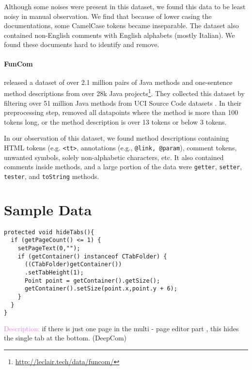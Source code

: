 \documentclass[11pt,a4paper]{article}
\begin{document}
Although some noises were present in this dataset, we found this data to be least noisy in manual observation. We find that because of lower casing the documentations, some CamelCase tokens became inseparable. The dataset also contained non-English comments with English alphabets (mostly Italian). We found these documents hard to identify and remove.

\paragraph{FunCom}
\citet{funcom} released a dataset of over 2.1 million pairs of Java methods and one-sentence method descriptions from over 28k Java projects\footnote{\href{http://leclair.tech/data/funcom/}{http://leclair.tech/data/funcom/}}. They collected this dataset by filtering over 51 million Java methods from UCI Source Code datasets \citep{uci-data}. In their preprocessing step, \citet{funcom} removed all datapoints where the method is more than 100 tokens long, or the method description is over 13 tokens or below 3 tokens.

In our observation of this dataset, we found method descriptions containing HTML tokens (e.g. \texttt{<tt>}, annotations (e.g., \texttt{@link, @param}), comment tokens, unwanted symbols, solely non-alphabetic characters, etc. It also contained comments inside methods, and a large portion of the data were \texttt{getter}, \texttt{setter}, \texttt{tester}, and \texttt{toString} methods.


\section{Sample Data}



\begin{lstlisting}
protected void hideTabs(){
  if (getPageCount() <= 1) {
    setPageText(0,"");
    if (getContainer() instanceof CTabFolder) {
      ((CTabFolder)getContainer())
      .setTabHeight(1);
      Point point = getContainer().getSize();
      getContainer().setSize(point.x,point.y + 6);
    }
  }
}
\end{lstlisting}
\vspace{-4pt}
{\small
\textcolor{violet}{Description:} if there is just one page in the multi - page editor part , this hides the single tab at the bottom. (DeepCom) \\ \vspace{-5pt}
\singlespacing
}
\end{document}
